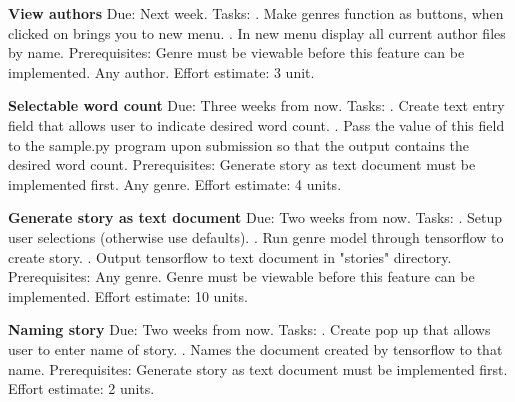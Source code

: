 \documentclass[12pt]{article}
\begin{document}
\textbf{View authors}\newline
Due: Next week.
\newline
Tasks: 
. Make genres function as buttons, when clicked on brings you to new menu.
. In new menu display all current author files by name.
\newline
Prerequisites:
\newline
Genre must be viewable before this feature can be implemented.
\newline
Any author.
\newline
Effort estimate: 3 unit. 

\textbf{Selectable word count}\newline
Due: Three weeks from now.
\newline
Tasks:
. Create text entry field that allows user to indicate desired word count.
. Pass the value of this field to the sample.py program upon submission so that the output contains the desired word count.
\newline
Prerequisites: 
\newline
Generate story as text document must be implemented first.
\newline
Any genre.
\newline
Effort estimate: 4 units.

\textbf{Generate story as text document}\newline
Due: Two weeks from now.
\newline
Tasks:
. Setup user selections (otherwise use defaults).
. Run genre model through tensorflow to create story.
. Output tensorflow to text document in "stories" directory.
Prerequisites: Any genre.
\newline
Genre must be viewable before this feature can be implemented.
\newline
Effort estimate: 10 units.

\textbf{Naming story}\newline
Due: Two weeks from now.
\newline
Tasks:
. Create pop up that allows user to enter name of story.
. Names the document created by tensorflow to that name.
\newline
Prerequisites:
\newline
Generate story as text document must be implemented first.
\newline
Effort estimate: 2 units.
\end{document}
